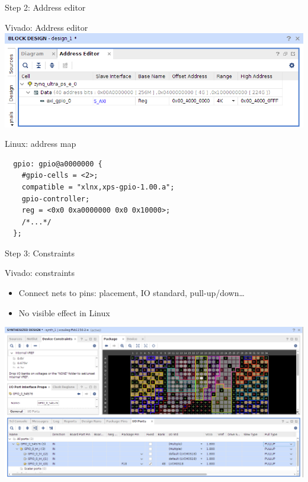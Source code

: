 \documentclass[xetex,table]{beamer}
\begin{document}
\begin{frame}[standout]
  Step 2: Address editor
\end{frame}

\begin{frame}{Vivado: Address editor}
  \center\includegraphics[width=1.0\textwidth]{images/address-editor.png}
\end{frame}

\begin{frame}[fragile]{Linux: address map}
  \begin{verbatim}
  gpio: gpio@a0000000 {
    #gpio-cells = <2>;
    compatible = "xlnx,xps-gpio-1.00.a";
    gpio-controller;
    reg = <0x0 0xa0000000 0x0 0x10000>;
    /*...*/
  };
  \end{verbatim}
\end{frame}

\begin{frame}[standout]
  Step 3: Constraints
\end{frame}

\begin{frame}{Vivado: constraints}
  \begin{itemize}
  \item Connect nets to pins: placement, IO standard, pull-up/down\dots
  \item No visible effect in Linux
  \end{itemize}

  \center\includegraphics[width=1.0\textwidth]{images/pin-assignment.png}
\end{frame}
\end{document}
